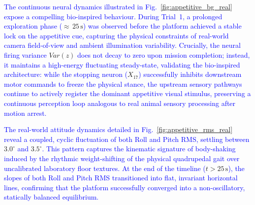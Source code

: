 \documentclass[preprint,12pt]{elsarticle}
\newcommand{\revblue}[1]{\textcolor{blue}{#1}}
\begin{document}
\revblue{The continuous neural dynamics illustrated in Fig.~}\ref{fig:appetitive_bg_real}\revblue{ expose a compelling bio-inspired behaviour. During Trial~1, a prolonged exploration phase (}${\approx}\,25\,\text{s}$\revblue{) was observed before the platform achieved a stable lock on the appetitive cue, capturing the physical constraints of real-world camera field-of-view and ambient illumination variability. Crucially, the neural firing variance }$Var(z)$\revblue{ does not decay to zero upon mission completion; instead, it maintains a high-energy fluctuating steady-state, validating the bio-inspired architecture: while the stopping neuron (}$X_{17}$\revblue{) successfully inhibits downstream motor commands to freeze the physical stance, the upstream sensory pathways continue to actively register the dominant appetitive visual stimulus, preserving a continuous perception loop analogous to real animal sensory processing after motion arrest.}

\revblue{The real-world attitude dynamics detailed in Fig.~}\ref{fig:appetitive_rms_real}\revblue{ reveal a coupled, cyclic fluctuation of both Roll and Pitch RMS, settling between }$3.0^{\circ}$\revblue{ and }$3.5^{\circ}$\revblue{. This pattern captures the kinematic signature of body-shaking induced by the rhythmic weight-shifting of the physical quadrupedal gait over uncalibrated laboratory floor textures. At the end of the timeline (}$t > 25\,\text{s}$\revblue{), the slopes of both Roll and Pitch RMS transitioned into flat, invariant horizontal lines, confirming that the platform successfully converged into a non-oscillatory, statically balanced equilibrium.}

\end{document}
